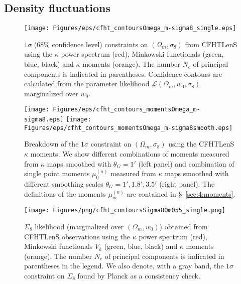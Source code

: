 \subsection{Density fluctuations}
\label{sec:6:omsi8}
%
\begin{figure}
\begin{center}
\texttt{[image: Figures/eps/cfht\_contoursOmega\_m-sigma8\_single.eps]}
\end{center}
\caption{$1\sigma$ (68\% confidence level) constraints on $(\Omega_m,\sigma_8)$ from CFHTLenS using the $\kappa$ power spectrum (red), Minkowski functionals (green, blue, black) and $\kappa$ moments (orange). The number $N_c$ of principal components is indicated in parentheses. Confidence contours are calculated from the parameter likelihood $\mathcal{L}(\Omega_m,w_0,\sigma_8)$ marginalized over $w_0$.}
\label{fig:6:cOmSisingle}
\end{figure}
%
\begin{figure}
\begin{center}
\texttt{[image: Figures/eps/cfht\_contours\_momentsOmega\_m-sigma8.eps]} \texttt{[image: Figures/eps/cfht\_contours\_momentsOmega\_m-sigma8smooth.eps]}
\end{center}
\caption{Breakdown of the $1\sigma$ constraint on $(\Omega_m,\sigma_8)$ using the CFHTLenS $\kappa$ moments. We show different combinations of moments measured from $\kappa$ maps smoothed with $\theta_G=1'$ (left panel) and combination of single point moments $\mu_0^{(n)}$ measured from $\kappa$ maps smoothed with different smoothing scales $\theta_G=1',1.8',3.5'$ (right panel). The definitions of the moments $\mu_m^{(n)}$ are contained in \S~\ref{sec:4:moments}.}
\label{fig:6:cOmSimoments}
\end{figure}
%
\begin{figure}
\begin{center}
\texttt{[image: Figures/png/cfht\_contoursSigma8Om055\_single.png]}
\end{center}
\caption{$\Sigma_8$ likelihood (marginalized over $(\Omega_m,w_0)$) obtained from CFHTLenS observations using the $\kappa$ power spectrum (red), Minkowski functionals $V_k$ (green, blue, black) and $\kappa$ moments (orange). The number $N_c$ of principal components is indicated in parentheses in the legend. We also denote, with a gray band, the $1\sigma$ constraint on $\Sigma_8$ found by Planck \citep{Planck15} as a consistency check.}
\label{fig:6:cSi855}
\end{figure}
%
